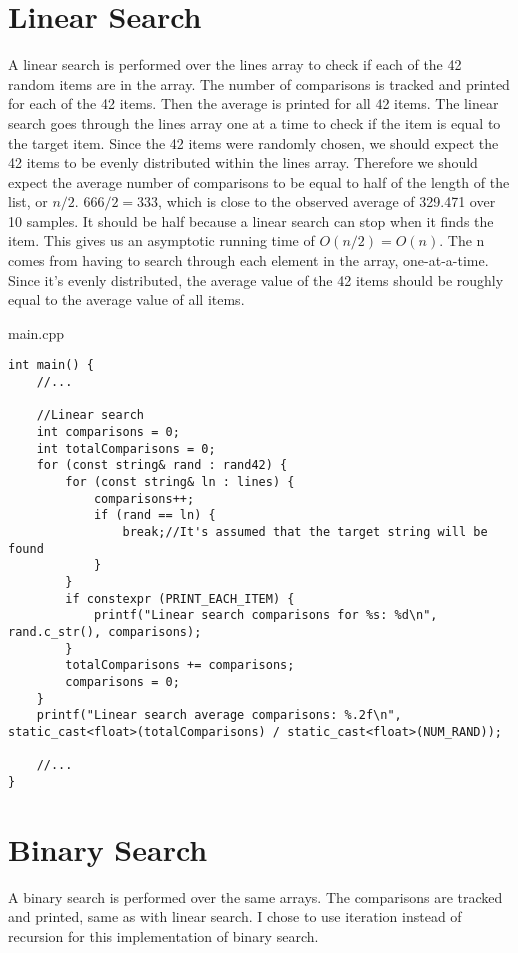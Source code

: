 \documentclass[letterpaper, 10pt,DIV=13]{scrartcl}
\numberwithin{equation}{section} %
\numberwithin{figure}{section} %
\numberwithin{table}{section} %
\begin{document}
\section{Linear Search}

A linear search is performed over the lines array to check if each of the 42 random items are in the array.
The number of comparisons is tracked and printed for each of the 42 items. Then the average is printed for all
42 items. The linear search goes through the lines array one at a time to check if the item is equal to the
target item. Since the 42 items were randomly chosen, we should expect the 42 items to be evenly distributed
within the lines array. Therefore we should expect the average number of comparisons to be equal to half of
the length of the list, or $n/2$. $666/2=333$, which is close to the observed average of 329.471 over 10 samples.
It should be half because a linear search can stop when it finds the item. This gives us an asymptotic running
time of $O(n/2) = O(n)$. The n comes from having to search through each element in the array, one-at-a-time.
Since it's evenly distributed, the average value of the 42 items should be roughly equal to the average value
of all items.

main.cpp
\begin{verbatim}
int main() {
    //...

    //Linear search
    int comparisons = 0;
    int totalComparisons = 0;
    for (const string& rand : rand42) {
        for (const string& ln : lines) {
            comparisons++;
            if (rand == ln) {
                break;//It's assumed that the target string will be found
            }
        }
        if constexpr (PRINT_EACH_ITEM) {
            printf("Linear search comparisons for %s: %d\n", rand.c_str(), comparisons);
        }
        totalComparisons += comparisons;
        comparisons = 0;
    }
    printf("Linear search average comparisons: %.2f\n", static_cast<float>(totalComparisons) / static_cast<float>(NUM_RAND));

    //...
}
\end{verbatim}

\section{Binary Search}

A binary search is performed over the same arrays. The comparisons are tracked and printed, same as with
linear search. I chose to use iteration instead of recursion for this implementation of binary search.
\end{document}
